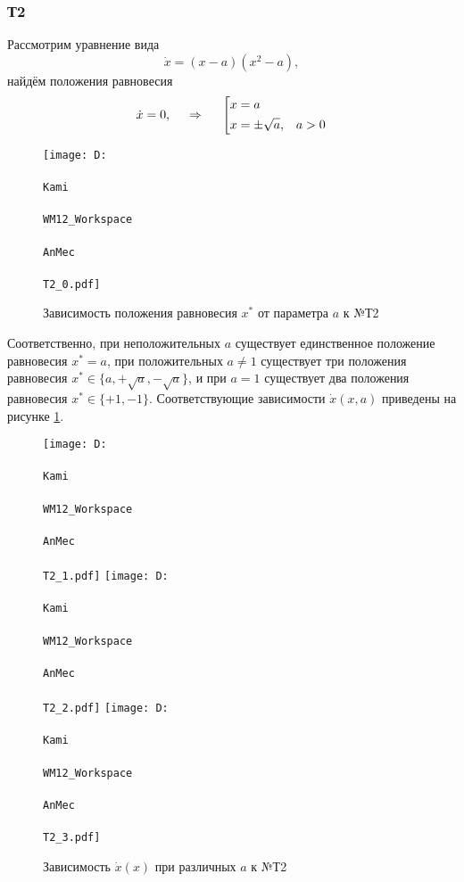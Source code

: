 \subsubsection*{Т2}


Рассмотрим уравнение вида
\begin{equation*}
    \dot{x} = (x-a)(x^2-a),
\end{equation*}
найдём положения равновесия
\begin{equation*}
    \dot{x}=0,
    \hspace{0.5cm} \Rightarrow \hspace{0.5cm}
    \left[\begin{aligned}
        x &= a             & \\
        x &= \pm \sqrt{a},  &a > 0
    \end{aligned}\right.
\end{equation*}
\begin{figure}[ht]
    \centering
    \texttt{[image: D:\\\\Kami\\\\WM12\_Workspace\\\\AnMec\\\\T2\_0.pdf]}
    \caption{Зависимость положения равновесия $x^*$ от параметра $a$ к  №Т2}
\end{figure}
Соответственно, при неположительных $a$ существует единственное положение равновесия $x^*=a$, при положительных $a \neq 1$ существует три положения равновесия $x^* \in \{a, +\sqrt{a}, -\sqrt{a}\}$, и при $a=1$ существует два положения равновесия $x^* \in \{+1, -1\}$. Соответствующие зависимости $\dot{x}(x, a)$ приведены на рисунке \ref{IT2}.
\begin{figure}[ht]
    \centering
    \hspace{0.3cm}
    \texttt{[image: D:\\\\Kami\\\\WM12\_Workspace\\\\AnMec\\\\T2\_1.pdf]}
    \hspace{0.3cm}
    \texttt{[image: D:\\\\Kami\\\\WM12\_Workspace\\\\AnMec\\\\T2\_2.pdf]}
    \hspace{0.3cm}
    \texttt{[image: D:\\\\Kami\\\\WM12\_Workspace\\\\AnMec\\\\T2\_3.pdf]}
    \caption{Зависимость $\dot{x}(x)$ при различных $a$ к  №Т2}
    \label{IT2}
\end{figure}